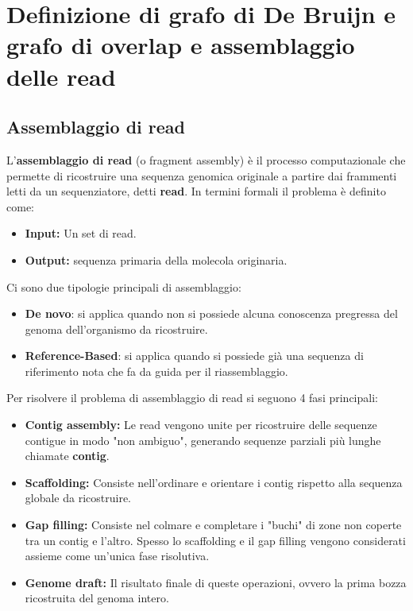 \chapter{Definizione di grafo di De Bruijn e grafo di overlap e assemblaggio delle read}

\section*{Assemblaggio di read}
L'\textbf{assemblaggio di read} (o fragment assembly) è il processo computazionale che permette di 
ricostruire una sequenza genomica originale a partire dai frammenti letti da un sequenziatore, detti \textbf{read}. 
In termini formali il problema è definito come:
\begin{itemize}
    \item \textbf{Input:} Un set di read.
    \item \textbf{Output:} sequenza primaria della molecola originaria.
\end{itemize}

Ci sono due tipologie principali di assemblaggio:
\begin{itemize}
    \item \textbf{De novo}: si applica quando non si possiede alcuna conoscenza pregressa del genoma dell'organismo da ricostruire.
    \item \textbf{Reference-Based}: si applica quando si possiede già una sequenza di riferimento nota che fa da guida per il riassemblaggio.
\end{itemize}

Per risolvere il problema di assemblaggio di read si seguono 4 fasi principali:
\begin{itemize}
    \item \textbf{Contig assembly:} Le read vengono unite per ricostruire delle sequenze
    contigue in modo "non ambiguo", generando sequenze parziali più lunghe chiamate \textbf{contig}.
    \item \textbf{Scaffolding:} Consiste nell'ordinare e orientare i contig rispetto alla sequenza globale da ricostruire.
    \item \textbf{Gap filling:} Consiste nel colmare e completare i "buchi" di zone non coperte tra 
    un contig e l'altro. Spesso lo scaffolding e il gap filling vengono considerati assieme come un'unica fase risolutiva.
    \item \textbf{Genome draft:} Il risultato finale di queste operazioni, ovvero la prima bozza ricostruita del genoma intero.
\end{itemize}

